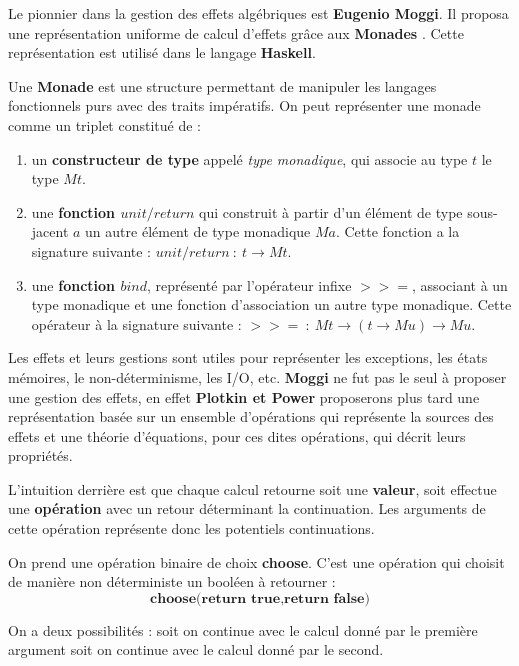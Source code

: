 	Le pionnier dans la gestion des effets algébriques est \textbf{Eugenio Moggi}. Il proposa une représentation uniforme de calcul d'effets grâce aux \textbf{Monades} \cite{DBLP:conf/ac/BentonHM00}. 
	Cette représentation est utilisé dans le langage \textbf{Haskell}.
	
	\begin{definition}
		Une \textbf{Monade} est une structure permettant de manipuler les langages fonctionnels purs
		avec des traits impératifs.
		On peut représenter une monade comme un triplet constitué de : 
		\begin{enumerate}
			\item un \textbf{constructeur de type} appelé \textit{type monadique}, qui associe au type $t$ le type $Mt$.
			\item une \textbf{fonction $unit/return$} qui construit à partir d'un élément de type 
			sous-jacent $a$ un autre élément de type monadique $Ma$. Cette fonction a la signature suivante : $unit/return~:~t \rightarrow Mt$.
			\item une \textbf{fonction $bind$}, représenté par l'opérateur infixe $>>=$, associant à un type monadique
			et une fonction d'association un autre type monadique. Cette opérateur à la signature suivante : $>>=~:~Mt \rightarrow (t \rightarrow Mu) \rightarrow Mu$.
		\end{enumerate}
	\end{definition}

	Les effets et leurs gestions sont utiles pour représenter les exceptions, les états mémoires, le non-déterminisme, les I/O, etc. \textbf{Moggi} ne fut pas le seul à proposer une gestion des effets, en effet \textbf{Plotkin et Power} proposerons plus tard une représentation basée sur un ensemble d'opérations qui représente la sources des effets et une théorie d'équations, pour ces dites opérations, qui décrit leurs propriétés.
	
	L'intuition derrière est que chaque calcul retourne soit une \textbf{valeur}, soit effectue une \textbf{opération} avec un retour déterminant la continuation. Les arguments de cette opération représente donc les potentiels continuations.
	
	\begin{exemple}
		On prend une opération binaire de choix \textbf{choose}. C'est une opération qui choisit de manière non déterministe un booléen à retourner :
		\[\textbf{choose(return true,return false)}\]
		
		On a deux possibilités : soit on continue avec le calcul donné par le première argument soit on continue avec le calcul donné par le second.
	\end{exemple}

